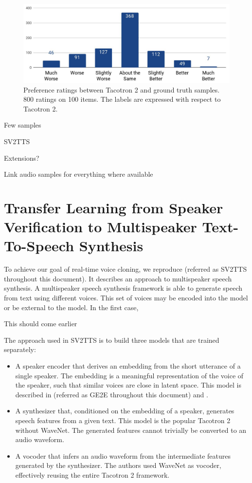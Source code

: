 \documentclass[a4paper, oneside, 12pt, english]{article}
\begin{document}
\begin{figure}[h]
	\centering
	\includegraphics[width=.8\linewidth]{images/tacotron2_results.png}
	\caption{Preference ratings between Tacotron 2 and ground truth samples. 800 ratings on 100 items. The labels are expressed with respect to Tacotron 2.}
	\label{tacotron2_results}
\end{figure}


\color{red}
Few samples

SV2TTS

Extensions?

Link audio samples for everything where available
\color{black}


\section{Transfer Learning from Speaker Verification to Multispeaker Text-To-Speech Synthesis}
To achieve our goal of real-time voice cloning, we reproduce \citep{SV2TTS} (referred as SV2TTS throughout this document). It describes an approach to multispeaker speech synthesis. A multispeaker speech synthesis framework is able to generate speech from text using different voices. This set of voices may be encoded into the model or be external to the model. In the first case, 

\color{red}This should come earlier\color{black}

The approach used in SV2TTS is to build three models that are trained separately:
\begin{itemize}
	\item A speaker encoder that derives an embedding from the short utterance of a single speaker. The embedding is a meaningful representation of the voice of the speaker, such that similar voices are close in latent space. This model is described in \citep{GE2E} (referred as GE2E throughout this document) and \citep{TE2E}.
	\item A synthesizer that, conditioned on the embedding of a speaker, generates speech features from a given text. This model is the popular Tacotron 2 \citep{Tacotron2} without WaveNet. The generated features cannot trivially be converted to an audio waveform. 
	\item A vocoder that infers an audio waveform from the intermediate features generated by the synthesizer. The authors used WaveNet \citep{WaveNet} as vocoder, effectively reusing the entire Tacotron 2 framework.
\end{itemize}
\end{document}
